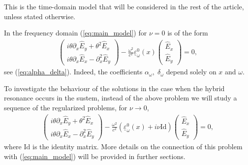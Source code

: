 {This is the time-domain model that will be considered in the rest of the article, unless stated otherwise. 

In the frequency domain (\ref{eq:main_model}) for $\nu=0$ is of the form 
\begin{align}
\label{eq:main_frequency_domain_intro}
\left(
\begin{matrix}
 i\theta \partial_x \hat{E}_y+\theta^2 \hat{E}_x\\
 i\theta \partial_x \hat{E}_x -\partial_x^2 \hat{E}_y
\end{matrix}
\right)-\frac{\omega^2}{c^2}
\underline{\varepsilon}_{\omega}^{0}(x)\left(
\begin{matrix}
 \hat{E}_x\\
 \hat{E}_y
\end{matrix}
\right)
=0,
\end{align}
see (\ref{eq:alpha_delta}). Indeed, the coefficients $\alpha_{\omega},\;\delta_{\omega}$ depend solely on $x$ and $\omega$.  

To investigate the behaviour of the solutions in the case when the hybrid resonance occurs in the sustem, 
instead of the above problem we will study a sequence of the regularized problems, for $\nu\rightarrow 0$, 
\begin{align}
\label{eq:seq_regularized}
\left(
\begin{matrix}
 i\theta \partial_x \hat{E}_y+\theta^2 \hat{E}_x\\
 i\theta \partial_x \hat{E}_x -\partial_x^2 \hat{E}_y
\end{matrix}
\right)-\frac{\omega^2}{c^2}
\left(\underline{\varepsilon}_{\omega}^{0}(x)+i\nu \mathrm{Id}\right)\left(
\begin{matrix}
 \hat{E}_x\\
 \hat{E}_y
\end{matrix}
\right)
=0,
\end{align}
where $\mathrm{Id}$ is the identity matrix. More details on the connection of this problem with (\ref{eq:main_model}) will be provided in further sections. 

}
